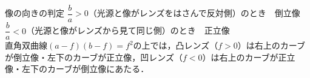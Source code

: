 \begin{matome}{像の向きの判定}
\hspace{3mm} $\dfrac{b}{a}>0$（光源と像がレンズをはさんで反対側）のとき　{\gtfamily 倒立像}\\
\hspace{3mm} $\dfrac{b}{a}<0$（光源と像がレンズから見て同じ側）のとき　{\gtfamily 正立像}\\[1mm]
\hspace{3mm}直角双曲線$(a-f)(b-f)=f^2$の上では，{\gtfamily 凸レンズ（$f>0$）は右上のカーブが倒立像・左下のカーブが正立像}，{\gtfamily 凹レンズ（$f<0$）は右上のカーブが正立像・左下のカーブが倒立像}にあたる．
\end{matome}

\bsNeed{56mm}
